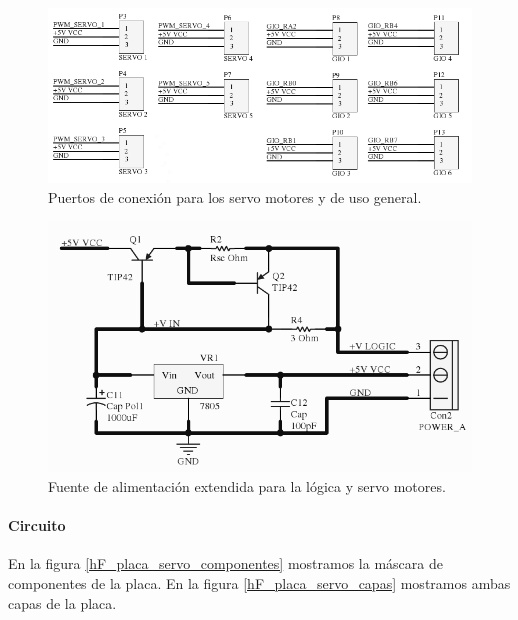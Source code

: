 \begin{figure}
	\centering
	\includegraphics[scale=.35]{figuras/servo_schemaPort.png}
	\caption{Puertos de conexi\'on para los servo motores y de uso general.}
	\label{hF_placa_servo_schema3}
\end{figure}

\begin{figure}
	\centering
	\includegraphics[scale=.3]{figuras/servo_schemaFuente.png}
	\caption{Fuente de alimentaci\'on extendida para la l\'ogica y servo motores.}
	\label{hF_placa_servo_schema4}
\end{figure}

\paragraph{Circuito}
\label{h_placas_servos_circuito}

En la figura \ref{hF_placa_servo_componentes} mostramos la m\'ascara de componentes de la placa.
En la figura \ref{hF_placa_servo_capas} mostramos ambas capas de la placa.

